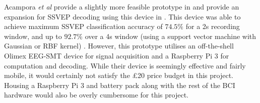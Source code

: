 Acampora \textit{et al} provide a slightly more feasible prototype in \cite{acampora-dataset} and provide an expansion for SSVEP decoding using this device in \cite{acampora-svm-clf}. This device was able to achieve maximum SSVEP classification accuracy of $74.5\%$ for a 2s recording window, and up to $92.7\%$ over a 4s window (using a support vector machine with Gaussian or RBF kernel) \cite{acampora-svm-clf}. However, this prototype utilises an off-the-shell Olimex EEG-SMT device for signal acquisition and a Raspberry Pi 3 for computation and decoding. While their device is seemingly effective and fairly mobile, it would certainly not satisfy the £20 price budget in this project. Housing a Raspberry Pi 3 and battery pack along with the rest of the BCI hardware would also be overly cumbersome for this project.